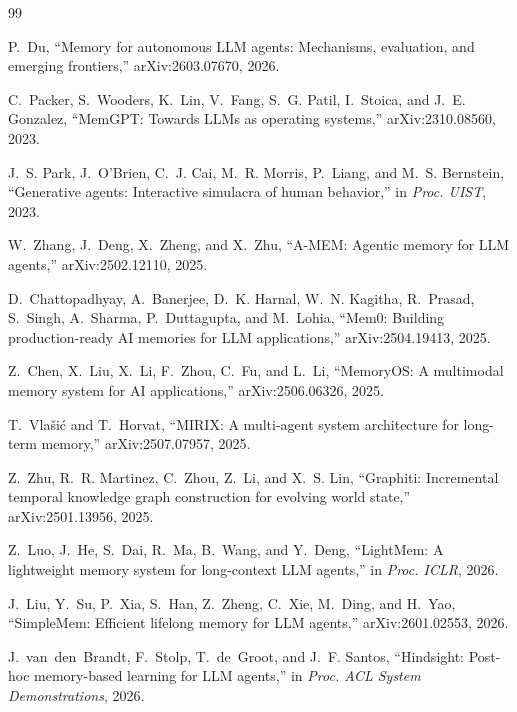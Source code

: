 \documentclass[UTF8,11pt]{ctexart}
\begin{document}
\begin{thebibliography}{99}

P.~Du, ``Memory for autonomous LLM agents: Mechanisms, evaluation, and emerging
frontiers,'' arXiv:2603.07670, 2026.

C.~Packer, S.~Wooders, K.~Lin, V.~Fang, S.~G. Patil, I.~Stoica, and J.~E.
Gonzalez, ``MemGPT: Towards LLMs as operating systems,'' arXiv:2310.08560, 2023.

J.~S. Park, J.~O'Brien, C.~J. Cai, M.~R. Morris, P.~Liang, and M.~S. Bernstein,
``Generative agents: Interactive simulacra of human behavior,'' in
\emph{Proc. UIST}, 2023.

W.~Zhang, J.~Deng, X.~Zheng, and X.~Zhu, ``A-MEM: Agentic memory for LLM
agents,'' arXiv:2502.12110, 2025.

D.~Chattopadhyay, A.~Banerjee, D.~K. Harnal, W.~N. Kagitha, R.~Prasad, S.~Singh,
A.~Sharma, P.~Duttagupta, and M.~Lohia, ``Mem0: Building production-ready AI
memories for LLM applications,'' arXiv:2504.19413, 2025.

Z.~Chen, X.~Liu, X.~Li, F.~Zhou, C.~Fu, and L.~Li, ``MemoryOS: A multimodal
memory system for AI applications,'' arXiv:2506.06326, 2025.

T.~Vla{\v{s}}i{\'c} and T.~Horvat, ``MIRIX: A multi-agent system architecture
for long-term memory,'' arXiv:2507.07957, 2025.

Z.~Zhu, R.~R. Martinez, C.~Zhou, Z.~Li, and X.~S. Lin, ``Graphiti: Incremental
temporal knowledge graph construction for evolving world state,'' arXiv:2501.13956,
2025.

Z.~Luo, J.~He, S.~Dai, R.~Ma, B.~Wang, and Y.~Deng, ``LightMem: A lightweight
memory system for long-context LLM agents,'' in \emph{Proc. ICLR}, 2026.

J.~Liu, Y.~Su, P.~Xia, S.~Han, Z.~Zheng, C.~Xie, M.~Ding, and H.~Yao,
``SimpleMem: Efficient lifelong memory for LLM agents,'' arXiv:2601.02553, 2026.

J.~van~den~Brandt, F.~Stolp, T.~de~Groot, and J.~F. Santos, ``Hindsight:
Post-hoc memory-based learning for LLM agents,'' in \emph{Proc. ACL System
Demonstrations}, 2026.


\end{thebibliography}
\end{document}
